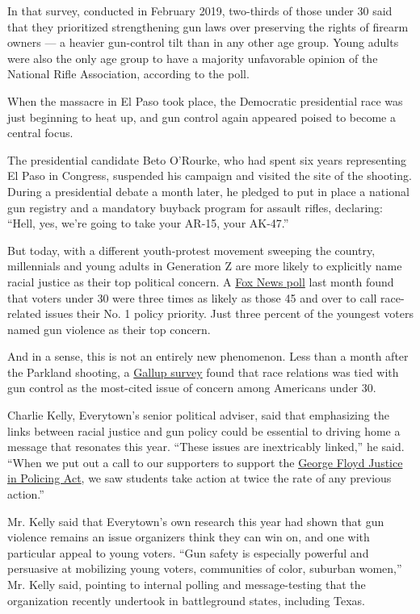 In that survey, conducted in February 2019, two-thirds of those under 30
said that they prioritized strengthening gun laws over preserving the
rights of firearm owners --- a heavier gun-control tilt than in any
other age group. Young adults were also the only age group to have a
majority unfavorable opinion of the National Rifle Association,
according to the poll.

When the massacre in El Paso took place, the Democratic presidential
race was just beginning to heat up, and gun control again appeared
poised to become a central focus.

The presidential candidate Beto O'Rourke, who had spent six years
representing El Paso in Congress, suspended his campaign and visited the
site of the shooting. During a presidential debate a month later, he
pledged to put in place a national gun registry and a mandatory buyback
program for assault rifles, declaring: ``Hell, yes, we're going to take
your AR-15, your AK-47.''

But today, with a different youth-protest movement sweeping the country,
millennials and young adults in Generation Z are more likely to
explicitly name racial justice as their top political concern. A
\href{https://static.foxnews.com/foxnews.com/content/uploads/2020/07/Fox_July-12-15-2020_Complete_National_Topline_July-19-Release.pdf}{Fox
News poll} last month found that voters under 30 were three times as
likely as those 45 and over to call race-related issues their No. 1
policy priority. Just three percent of the youngest voters named gun
violence as their top concern.

And in a sense, this is not an entirely new phenomenon. Less than a
month after the Parkland shooting, a
\href{https://news.gallup.com/poll/229562/preference-stricter-gun-laws-highest-1993.aspx}{Gallup
survey} found that race relations was tied with gun control as the
most-cited issue of concern among Americans under 30.

Charlie Kelly, Everytown's senior political adviser, said that
emphasizing the links between racial justice and gun policy could be
essential to driving home a message that resonates this year. ``These
issues are inextricably linked,'' he said. ``When we put out a call to
our supporters to support the
\href{https://www.nytimes3xbfgragh.onion/2020/06/25/us/politics/house-police-overhaul-bill.html}{George
Floyd Justice in Policing Act}, we saw students take action at twice the
rate of any previous action.''

Mr. Kelly said that Everytown's own research this year had shown that
gun violence remains an issue organizers think they can win on, and one
with particular appeal to young voters. ``Gun safety is especially
powerful and persuasive at mobilizing young voters, communities of
color, suburban women,'' Mr. Kelly said, pointing to internal polling
and message-testing that the organization recently undertook in
battleground states, including Texas.

